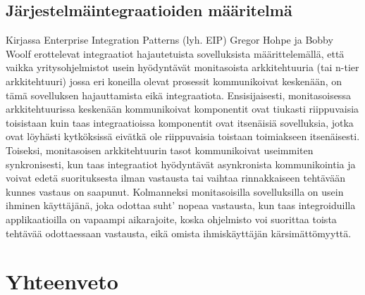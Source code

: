 \section{Järjestelmäintegraatioiden määritelmä}
Kirjassa Enterprise Integration Patterns (lyh. EIP) Gregor Hohpe ja Bobby Woolf \citep{10.5555/940308}
erottelevat integraatiot hajautetuista sovelluksista määrittelemällä, että vaikka
yritysohjelmistot usein hyödyntävät monitasoista arkkitehtuuria (tai n-tier arkkitehtuuri) jossa
eri koneilla olevat prosessit kommunikoivat keskenään, on tämä sovelluksen hajauttamista
eikä integraatiota. Ensisijaisesti, monitasoisessa arkkitehtuurissa keskenään kommunikoivat
komponentit ovat tiukasti riippuvaisia toisistaan kuin taas integraatioissa komponentit ovat
itsenäisiä sovelluksia, jotka ovat löyhästi kytköksissä eivätkä ole riippuvaisia toistaan
toimiakseen itsenäisesti. Toiseksi, monitasoisen arkkitehtuurin tasot kommunikoivat
useimmiten synkronisesti, kun taas integraatiot hyödyntävät asynkronista kommunikointia ja
voivat edetä suorituksesta ilman vastausta tai vaihtaa rinnakkaiseen tehtävään kunnes vastaus
on saapunut. Kolmanneksi monitasoisilla sovelluksilla on usein ihminen käyttäjänä, joka
odottaa suht’ nopeaa vastausta, kun taas integroiduilla applikaatioilla on vapaampi aikarajoite,
koska ohjelmisto voi suorittaa toista tehtävää odottaessaan vastausta, eikä omista
ihmiskäyttäjän kärsimättömyyttä.


\chapter{Yhteenveto}
